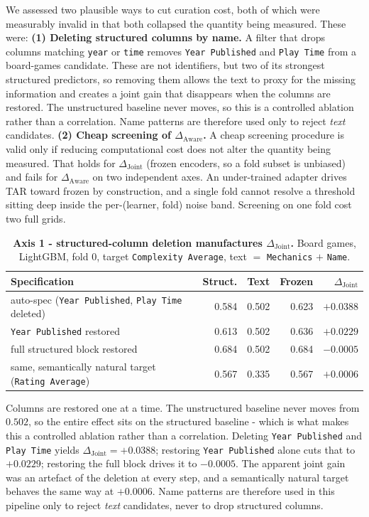\documentclass{article}
\newcommand{\djoint}{\Delta_{\text{Joint}}}
\newcommand{\daware}{\Delta_{\text{Aware}}}
\begin{document}
\noindent We assessed two plausible ways to cut curation cost, both of which were measurably invalid in that both collapsed the quantity being measured. These were: \textbf{  (1) Deleting structured columns by name.} A filter that drops columns matching \texttt{year} or \texttt{time} removes \texttt{Year
Published} and \texttt{Play Time} from a board-games candidate. These are not identifiers, but two of its strongest structured predictors, so removing them allows the text to proxy for the missing information and creates a joint gain that disappears when the columns are restored. The unstructured baseline never moves, so this is a controlled
ablation rather than a correlation. Name patterns are therefore used only to reject \emph{text}
candidates. \textbf{(2) Cheap screening of $\daware$.} A cheap screening procedure is valid only if reducing computational cost does not alter the quantity being measured. That holds for $\djoint$ (frozen encoders, so a
fold subset is unbiased) and fails for $\daware$ on two independent axes. An under-trained adapter
drives TAR toward frozen by construction, and a single fold cannot resolve a threshold sitting
deep inside the per-(learner, fold) noise band. Screening on one fold cost two full grids.

\begin{table}[H]
\centering\small
\caption{\textbf{Axis 1 - structured-column deletion manufactures $\djoint$.} Board games,
LightGBM, fold 0, target \texttt{Complexity Average}, text $=$ \texttt{Mechanics} $+$
\texttt{Name}.}
\begin{tabular}{lrrrr}
\toprule
Specification & Struct. & Text & Frozen & $\djoint$ \\
\midrule
auto-spec (\texttt{Year Published}, \texttt{Play Time} deleted) & 0.584 & 0.502 & 0.623 & $\mathbf{+0.0388}$ \\
\texttt{Year Published} restored & 0.613 & 0.502 & 0.636 & $+0.0229$ \\
full structured block restored & 0.684 & 0.502 & 0.684 & $\mathbf{-0.0005}$ \\
\midrule
same, semantically natural target (\texttt{Rating Average}) & 0.567 & 0.335 & 0.567 & $+0.0006$ \\
\bottomrule
\end{tabular}
\end{table}

\noindent Columns are restored one at a time. The unstructured baseline never moves from $0.502$, so the
entire effect sits on the structured baseline - which is what makes this a controlled
ablation rather than a correlation. Deleting \texttt{Year Published} and \texttt{Play Time}
yields $\djoint = +0.0388$; restoring \texttt{Year Published} alone cuts that to $+0.0229$;
restoring the full block drives it to $-0.0005$. The apparent joint gain was an artefact of the
deletion at every step, and a semantically natural target behaves the same way at $+0.0006$.
Name patterns are therefore used in this pipeline only to reject \emph{text} candidates, never
to drop structured columns.
\end{document}
